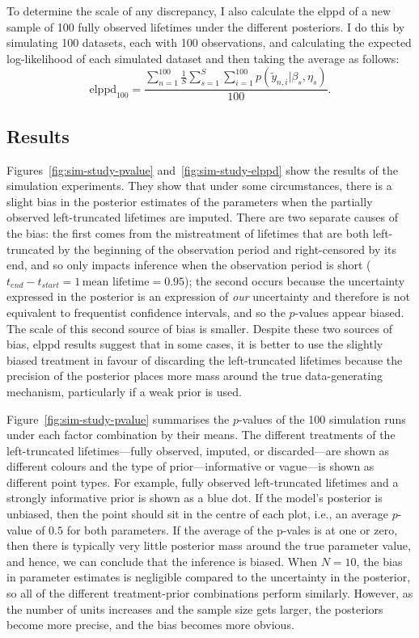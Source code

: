 To determine the scale of any discrepancy, I also calculate the elppd of a new sample of 100 fully observed lifetimes under the different posteriors. I do this by simulating 100 datasets, each with 100 observations, and calculating the expected log-likelihood of each simulated dataset and then taking the average as follows:
\begin{equation*}
    \label{eq:elppd-100}
    \text{elppd}_{100} = \frac{\sum_{n = 1}^{100}\frac{1}{S}\sum_{s = 1}^{S}\sum_{i = 1}^{100}p(\tilde{y}_{n, i}|\beta_s, \eta_s)}{100}.
\end{equation*}

\subsection{Results} \label{subsec:sim-experiment-results}

Figures~\ref{fig:sim-study-pvalue} and~\ref{fig:sim-study-elppd} show the results of the simulation experiments. They show that under some circumstances, there is a slight bias in the posterior estimates of the parameters when the partially observed left-truncated lifetimes are imputed. There are two separate causes of the bias: the first comes from the mistreatment of lifetimes that are both left-truncated by the beginning of the observation period and right-censored by its end, and so only impacts inference when the observation period is short ($t_{end} - t_{start} = 1 \, \text{mean lifetime} = 0.95$); the second occurs because the uncertainty expressed in the posterior is an expression of \textit{our} uncertainty and therefore is not equivalent to frequentist confidence intervals, and so the $p$-values appear biased. The scale of this second source of bias is smaller. Despite these two sources of bias, elppd results suggest that in some cases, it is better to use the slightly biased treatment in favour of discarding the left-truncated lifetimes because the precision of the posterior places more mass around the true data-generating mechanism, particularly if a weak prior is used.

Figure~\ref{fig:sim-study-pvalue} summarises the $p$-values of the 100 simulation runs under each factor combination by their means. The different treatments of the left-truncated lifetimes---fully observed, imputed, or discarded---are shown as different colours and the type of prior---informative or vague---is shown as different point types. For example, fully observed left-truncated lifetimes and a strongly informative prior is shown as a blue dot. If the model's posterior is unbiased, then the point should sit in the centre of each plot, i.e., an average $p$-value of $0.5$ for both parameters. If the average of the p-vales is at one or zero, then there is typically very little posterior mass around the true parameter value, and hence, we can conclude that the inference is biased. When $N = 10$, the bias in parameter estimates is negligible compared to the uncertainty in the posterior, so all of the different treatment-prior combinations perform similarly. However, as the number of units increases and the sample size gets larger, the posteriors become more precise, and the bias becomes more obvious.

